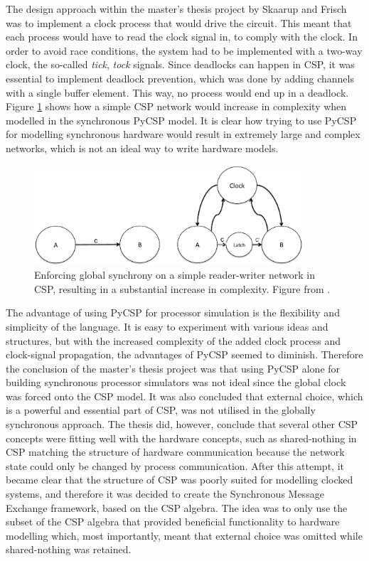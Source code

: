 The design approach within the master's thesis project by Skaarup and Frisch was to implement a clock process that would drive the circuit. This meant that each process would have to read the clock signal in, to comply with the clock. In order to avoid race conditions, the system had to be implemented with a two-way clock, the so-called \textit{tick}, \textit{tock} signals. Since deadlocks can happen in CSP, it was essential to implement deadlock prevention, which was done by adding channels with a single buffer element. This way, no process would end up in a deadlock. Figure \ref{fig:sme:clock_latch} shows how a simple CSP network would increase in complexity when modelled in the synchronous PyCSP model. It is clear how trying to use PyCSP for modelling synchronous hardware would result in extremely large and complex networks, which is not an ideal way to write hardware models.\\
\begin{figure}[h!]
\centering
\includegraphics[width=10.0cm]{figures/clocked.pdf}
\caption{Enforcing global synchrony on a simple reader-writer network in CSP, resulting in a substantial increase in complexity. Figure from \cite{Vinter2014}.}
\label{fig:sme:clock_latch}
\end{figure}

The advantage of using PyCSP for processor simulation is the flexibility and simplicity of the language. It is easy to experiment with various ideas and structures, but with the increased complexity of the added clock process and clock-signal propagation, the advantages of PyCSP seemed to diminish. Therefore the conclusion of the master's thesis project was that using PyCSP alone for building synchronous processor simulators was not ideal since the global clock was forced onto the CSP model. It was also concluded that external choice, which is a powerful and essential part of CSP, was not utilised in the globally synchronous approach. The thesis did, however, conclude that several other CSP concepts were fitting well with the hardware concepts, such as shared-nothing in CSP matching the structure of hardware communication because the network state could only be changed by process communication.
After this attempt, it became clear that the structure of CSP was poorly suited for modelling clocked systems, and therefore it was decided to create the Synchronous Message Exchange framework, based on the CSP algebra. The idea was to only use the subset of the CSP algebra that provided beneficial functionality to hardware modelling which, most importantly, meant that external choice was omitted while shared-nothing was retained.
\\

